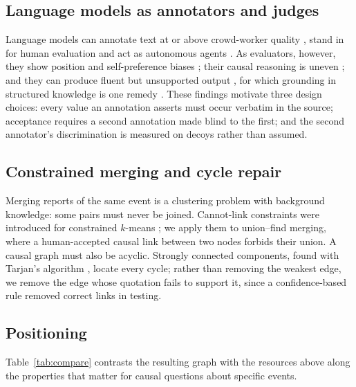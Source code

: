 \documentclass[pdflatex,sn-basic,lineno]{sn-jnl}
\theoremstyle{thmstylethree}
\theoremstyle{thmstyleone}
\begin{document}
\subsection{Language models as annotators and judges}
Language models can annotate text at or above crowd-worker quality \citep{gilardi,tornberg}, stand
in for human evaluation \citep{chiang} and act as autonomous agents \citep{agentsurvey,react}. As
evaluators, however, they show position and self-preference biases \citep{zheng,wangfair}; their
causal reasoning is uneven \citep{kiciman,cladder}; and they can produce fluent but unsupported
output \citep{hallucination}, for which grounding in structured knowledge is one remedy
\citep{pan24}. These findings motivate three design choices: every value an annotation asserts must
occur verbatim in the source; acceptance requires a second annotation made blind to the first; and
the second annotator's discrimination is measured on decoys rather than assumed.

\subsection{Constrained merging and cycle repair}
Merging reports of the same event is a clustering problem with background knowledge: some pairs
must never be joined. Cannot-link constraints were introduced for constrained $k$-means
\citep{wagstaff}; we apply them to union--find merging, where a human-accepted causal link between
two nodes forbids their union. A causal graph must also be acyclic. Strongly connected components,
found with Tarjan's algorithm \citep{tarjan}, locate every cycle; rather than removing the weakest
edge, we remove the edge whose quotation fails to support it, since a confidence-based rule removed
correct links in testing.

\subsection{Positioning}
Table~\ref{tab:compare} contrasts the resulting graph with the resources above along the properties
that matter for causal questions about specific events.
\end{document}
